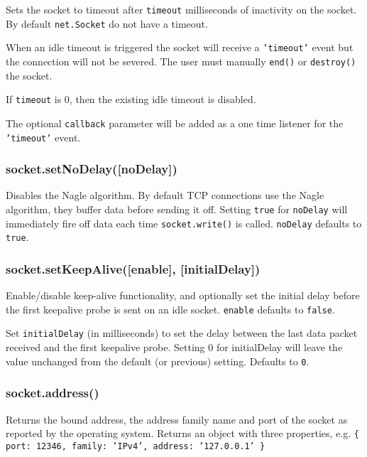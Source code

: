 Sets the socket to timeout after \texttt{timeout} milliseconds of
inactivity on the socket. By default \texttt{net.Socket} do not have a
timeout.

When an idle timeout is triggered the socket will receive a
\texttt{'timeout'} event but the connection will not be severed. The
user must manually \texttt{end()} or \texttt{destroy()} the socket.

If \texttt{timeout} is 0, then the existing idle timeout is disabled.

The optional \texttt{callback} parameter will be added as a one time
listener for the \texttt{'timeout'} event.

\subsubsection{socket.setNoDelay({[}noDelay{]})}\label{socket.setnodelaynodelay}

Disables the Nagle algorithm. By default TCP connections use the Nagle
algorithm, they buffer data before sending it off. Setting \texttt{true}
for \texttt{noDelay} will immediately fire off data each time
\texttt{socket.write()} is called. \texttt{noDelay} defaults to
\texttt{true}.

\subsubsection{socket.setKeepAlive({[}enable{]},
{[}initialDelay{]})}\label{socket.setkeepaliveenable-initialdelay}

Enable/disable keep-alive functionality, and optionally set the initial
delay before the first keepalive probe is sent on an idle socket.
\texttt{enable} defaults to \texttt{false}.

Set \texttt{initialDelay} (in milliseconds) to set the delay between the
last data packet received and the first keepalive probe. Setting 0 for
initialDelay will leave the value unchanged from the default (or
previous) setting. Defaults to \texttt{0}.

\subsubsection{socket.address()}\label{socket.address}

Returns the bound address, the address family name and port of the
socket as reported by the operating system. Returns an object with three
properties, e.g.
\texttt{\{ port: 12346, family: 'IPv4', address: '127.0.0.1' \}}

